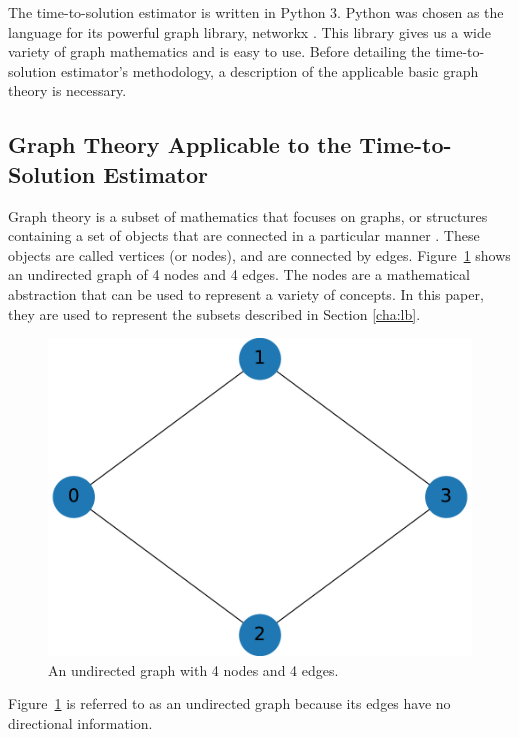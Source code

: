 \documentclass[times,final]{elsarticle}
\begin{document}
The time-to-solution estimator is written in Python 3. Python was chosen as the language for its powerful graph library, networkx \cite{networkx}.
This library gives us a wide variety of graph mathematics and is easy to use.
Before detailing the time-to-solution estimator's methodology, a description of the applicable basic graph theory is necessary.

\subsection{Graph Theory Applicable to the Time-to-Solution Estimator}

Graph theory is a subset of mathematics that focuses on graphs, or structures containing a set of objects that are connected in a particular manner \cite{graphtheory}.
These objects are called vertices (or nodes), and are connected by edges.
Figure~\ref{basic_graph} shows an undirected graph of 4 nodes and 4 edges. The nodes are a mathematical abstraction that can be used to represent a variety of concepts. In this paper, they are used to represent the subsets described in Section \ref{cha:lb}.
\begin{figure}[H]
\centering
\includegraphics[scale=0.5]{../figures/undirected_graph.pdf}
\caption{An undirected graph with 4 nodes and 4 edges. }
\label{basic_graph}
\end{figure}
Figure~\ref{basic_graph} is referred to as an undirected graph because its edges have no directional information.
\end{document}
